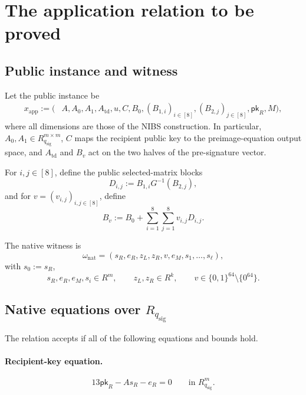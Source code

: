 \documentclass[11pt,a4paper]{article}
\newcommand{\Rsig}{R_{q_{\mathrm{sig}}}}
\newcommand{\pk}{\mathsf{pk}}
\begin{document}
\section{The application relation to be proved}

\subsection{Public instance and witness}

Let the public instance be
\begin{align*}
 x_{\mathrm{app}}:=(&A,A_0,A_1,A_{\mathrm{td}},u,C,B_0,
       (B_{1,i})_{i\in[8]},(B_{2,j})_{j\in[8]},\pk_R,M),
\end{align*}
where all dimensions are those of the NIBS construction.  In particular,
\(A_0,A_1\in\Rsig^{m\times m}\), \(C\) maps the recipient public key to the
preimage-equation output space, and \(A_{\mathrm{td}}\) and \(B_v\) act on the
two halves of the pre-signature vector.

For \(i,j\in[8]\), define the public selected-matrix blocks
\[
  D_{i,j}:=B_{1,i}G^{-1}(B_{2,j}),
\]
and for \(v=(v_{i,j})_{i,j\in[8]}\), define
\begin{equation}
  B_v:=B_0+\sum_{i=1}^{8}\sum_{j=1}^{8}v_{i,j}D_{i,j}.
  \label{eq:Bv}
\end{equation}

The native witness is
\[
  \omega_{\mathrm{nat}}
   =(s_R,e_R,z_L,z_R,v,e_M,s_1,\ldots,s_{\ell}),
\]
with \(s_0:=s_R\),
\[
  s_R,e_R,e_M,s_i\in R^m,\qquad
  z_L,z_R\in R^k,\qquad
  v\in\{0,1\}^{64}\setminus\{0^{64}\}.
\]

\subsection{Native equations over \(R_{q_{\mathrm{sig}}}\)}

The relation accepts if all of the following equations and bounds hold.

\paragraph{Recipient-key equation.}
\begin{equation}
  13\pk_R-A s_R-e_R=0
  \qquad\text{in }\Rsig^m.
  \label{eq:R1-native}
\end{equation}
\end{document}
